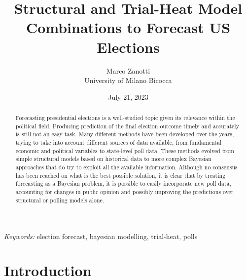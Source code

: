 \documentclass[
  12pt]{article}
\begin{document}
\def\spacingset#1{\renewcommand{\baselinestretch}%
{#1}\small\normalsize} \spacingset{1}



\date{July 21, 2023}
\title{\bf Structural and Trial-Heat Model Combinations to Forecast US
Elections}
\author{
Marco Zanotti\\
University of Milano Bicocca\\
}
\maketitle

\bigskip
\bigskip
\begin{abstract}
Forecasting presidential elections is a well-studied topic given its
relevance within the political field. Producing prediction of the final
election outcome timely and accurately is still not an easy task. Many
different methods have been developed over the years, trying to take
into account different sources of data available, from fundamental
economic and political variables to state-level poll data. These methods
evolved from simple structural models based on historical data to more
complex Bayesian approaches that do try to exploit all the available
information. Although no consensus has been reached on what is the best
possible solution, it is clear that by treating forecasting as a
Bayesian problem, it is possible to easily incorporate new poll data,
accounting for changes in public opinion and possibly improving the
predictions over structural or polling models alone.
\end{abstract}

\noindent%
{\it Keywords:} election forecast, bayesian modelling, trial-heat, polls
\vfill

\newpage
\spacingset{1.9} %
\ifdefined\Shaded\renewenvironment{Shaded}{\begin{tcolorbox}[boxrule=0pt, interior hidden, borderline west={3pt}{0pt}{shadecolor}, sharp corners, enhanced, breakable, frame hidden]}{\end{tcolorbox}}\fi

\hypertarget{sec-intro}{%
\section{Introduction}\label{sec-intro}}
\end{document}
